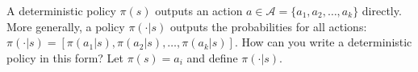 A deterministic policy $\pi(s)$ outputs an action $a \in \mathcal{A} = \{a_1, a_2, \ldots, a_k\}$ directly. More generally, a policy $\pi(\cdot | s)$ outputs the probabilities for all actions: $\pi(\cdot | s) = [\pi(a_1 | s), \pi(a_2 | s), \ldots, \pi(a_k | s)]$. How can you write a deterministic policy in this form? Let $\pi(s) = a_i$ and define $\pi(\cdot | s)$.  

